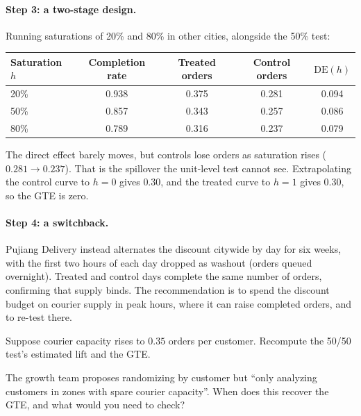 \documentclass[11pt]{article}
\begin{document}
\paragraph{Step 3: a two-stage design.} Running saturations of 20\% and 80\% in other cities, alongside the 50\% test:
\begin{center}
\begin{tabular}{lcccc}
\toprule
Saturation $h$ & Completion rate & Treated orders & Control orders & $\text{DE}(h)$ \\
\midrule
20\% & 0.938 & 0.375 & 0.281 & 0.094 \\
50\% & 0.857 & 0.343 & 0.257 & 0.086 \\
80\% & 0.789 & 0.316 & 0.237 & 0.079 \\
\bottomrule
\end{tabular}
\end{center}
The direct effect barely moves, but controls lose orders as saturation rises ($0.281 \to 0.237$). That is the
spillover the unit-level test cannot see. Extrapolating the control curve to $h = 0$ gives $0.30$, and the treated curve to $h = 1$
gives $0.30$, so the GTE is zero.

\paragraph{Step 4: a switchback.} Pujiang Delivery instead alternates the discount citywide by day for six weeks, with the first
two hours of each day dropped as washout (orders queued overnight). Treated and control days complete the same number
of orders, confirming that supply binds. The recommendation is to spend the discount budget on courier supply in
peak hours, where it can raise completed orders, and to re-test there.

\begin{exercise}[computation]
Suppose courier capacity rises to $0.35$ orders per customer. Recompute the 50/50 test's estimated lift and the GTE.
\end{exercise}

\begin{exercise}[judgment]
The growth team proposes randomizing by customer but ``only analyzing customers in zones with spare courier
capacity''. When does this recover the GTE, and what would you need to check?
\end{exercise}
\end{document}
